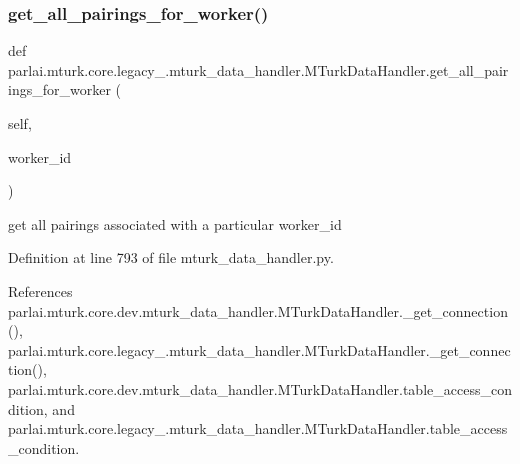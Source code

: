 \subsubsection{\texorpdfstring{get\+\_\+all\+\_\+pairings\+\_\+for\+\_\+worker()}{get\_all\_pairings\_for\_worker()}}
{\footnotesize\ttfamily def parlai.\+mturk.\+core.\+legacy\+\_.\+mturk\+\_\+data\+\_\+handler.\+M\+Turk\+Data\+Handler.\+get\+\_\+all\+\_\+pairings\+\_\+for\+\_\+worker (\begin{DoxyParamCaption}\item[{}]{self,  }\item[{}]{worker\+\_\+id }\end{DoxyParamCaption})}

\begin{DoxyVerb}get all pairings associated with a particular worker_id\end{DoxyVerb}
 

Definition at line 793 of file mturk\+\_\+data\+\_\+handler.\+py.



References parlai.\+mturk.\+core.\+dev.\+mturk\+\_\+data\+\_\+handler.\+M\+Turk\+Data\+Handler.\+\_\+get\+\_\+connection(), parlai.\+mturk.\+core.\+legacy\+\_.\+mturk\+\_\+data\+\_\+handler.\+M\+Turk\+Data\+Handler.\+\_\+get\+\_\+connection(), parlai.\+mturk.\+core.\+dev.\+mturk\+\_\+data\+\_\+handler.\+M\+Turk\+Data\+Handler.\+table\+\_\+access\+\_\+condition, and parlai.\+mturk.\+core.\+legacy\+\_.\+mturk\+\_\+data\+\_\+handler.\+M\+Turk\+Data\+Handler.\+table\+\_\+access\+\_\+condition.

